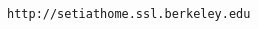\renewcommand{\refname}{References Cited \\ $\quad$ \\ \normalsize{\bf Note: references supported by prior NSF awards are indicated with a ``P''.}}
\begin{thebibliography}{66}

\texttt{http://setiathome.ssl.berkeley.edu}


\end{thebibliography}

